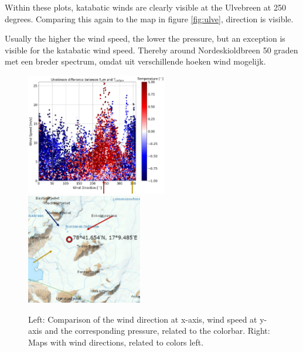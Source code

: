\documentclass[11pt]{report}
\begin{document}
Within these plots, katabatic winds are clearly visible at the Ulvebreen at 250 degrees. Comparing this again to the map in figure \ref{fig:ulve}, direction is visible.





Usually the higher the wind speed, the lower the pressure, but an exception is visible for the katabatic wind speed. Thereby around 
Nordeskioldbreen 50 graden met een breder spectrum, omdat uit verschillende hoeken wind mogelijk. 



\begin{figure}[h]
\includegraphics[scale=1, width=0.55\textwidth]{norde-WS-WD.jpg}
\includegraphics[scale=1, width=0.45\textwidth]{norde-WS-WD-rose-2.jpg}
\caption{Left: Comparison of the wind direction at x-axis, wind speed at y-axis and the corresponding pressure, related to the colorbar. Right: Maps with wind directions, related to colors left.}
\label{fig:PRnorde}
\end{figure}
\end{document}
